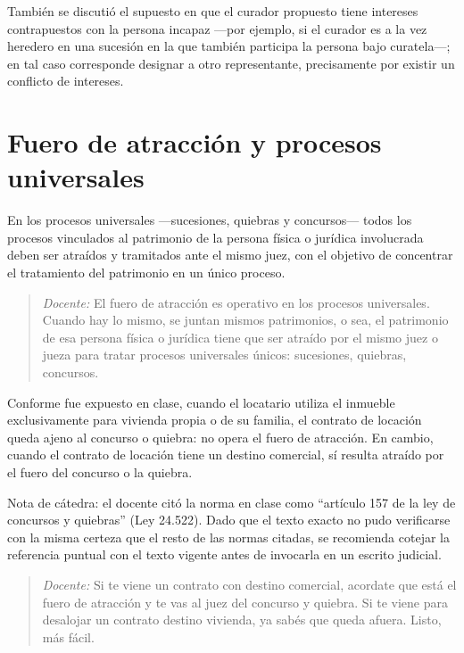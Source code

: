 \documentclass[12pt,oneside]{book}
\begin{document}
También se discutió el supuesto en que el curador propuesto tiene intereses contrapuestos con la persona incapaz —por ejemplo, si el curador es a la vez heredero en una sucesión en la que también participa la persona bajo curatela—; en tal caso corresponde designar a otro representante, precisamente por existir un conflicto de intereses.

\section{Fuero de atracción y procesos universales}

En los procesos universales —sucesiones, quiebras y concursos— todos los procesos vinculados al patrimonio de la persona física o jurídica involucrada deben ser atraídos y tramitados ante el mismo juez, con el objetivo de concentrar el tratamiento del patrimonio en un único proceso.

\begin{quote}
\textit{Docente:} El fuero de atracción es operativo en los procesos universales. Cuando hay lo mismo, se juntan mismos patrimonios, o sea, el patrimonio de esa persona física o jurídica tiene que ser atraído por el mismo juez o jueza para tratar procesos universales únicos: sucesiones, quiebras, concursos.
\end{quote}

\begin{important}
Conforme fue expuesto en clase, cuando el locatario utiliza el inmueble exclusivamente para vivienda propia o de su familia, el contrato de locación queda ajeno al concurso o quiebra: no opera el fuero de atracción. En cambio, cuando el contrato de locación tiene un destino comercial, sí resulta atraído por el fuero del concurso o la quiebra.

Nota de cátedra: el docente citó la norma en clase como ``artículo 157 de la ley de concursos y quiebras'' (Ley 24.522). Dado que el texto exacto no pudo verificarse con la misma certeza que el resto de las normas citadas, se recomienda cotejar la referencia puntual con el texto vigente antes de invocarla en un escrito judicial.
\end{important}

\begin{quote}
\textit{Docente:} Si te viene un contrato con destino comercial, acordate que está el fuero de atracción y te vas al juez del concurso y quiebra. Si te viene para desalojar un contrato destino vivienda, ya sabés que queda afuera. Listo, más fácil.
\end{quote}
\end{document}
